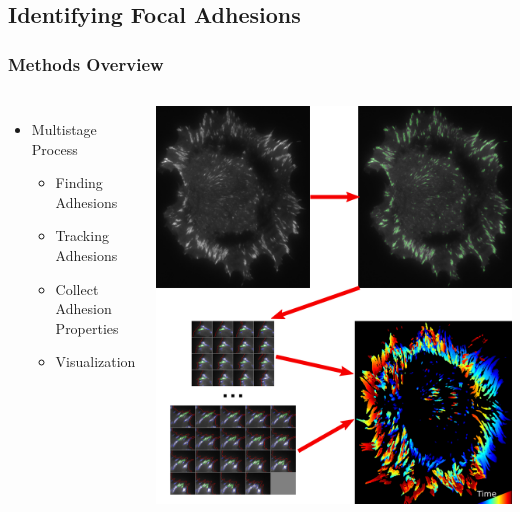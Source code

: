 \documentclass{beamer}
\begin{document}
\subsection{Identifying Focal Adhesions}
\begin{frame}
	\frametitle{Methods Overview}
	\begin{columns}
	\begin{itemize}
	\item Multistage Process
		\begin{itemize}
		\item Finding Adhesions
		\item Tracking Adhesions
		\item Collect Adhesion Properties
		\item Visualization
		\end{itemize}
	\end{itemize}
	\includegraphics[width=\textwidth]{figures/finding/method_overview/overview}
	\end{columns}
\end{frame}
\end{document}
